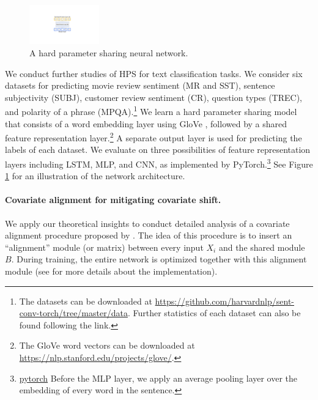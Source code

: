 \begin{figure}
	\vspace{-0.35in}
	\begin{center}
		\includegraphics[width=0.27\textwidth]{figures/mtl_model_arch.pdf}
	\end{center}
	\vspace{-0.28in}
	\caption{A hard parameter sharing neural network.}
	\label{fig_intro_arch}
\end{figure}
We conduct further studies of HPS for text classification tasks.
We consider six datasets for predicting movie review sentiment (MR and SST), sentence subjectivity (SUBJ), customer review sentiment (CR), question types (TREC), and polarity of a phrase (MPQA).\footnote{The datasets can be downloaded at \url{https://github.com/harvardnlp/sent-conv-torch/tree/master/data}. Further statistics of each dataset can also be found following the link.}
We learn a hard parameter sharing model that consists of a word embedding layer using GloVe \cite{pennington2014glove}, followed by a shared feature representation layer.\footnote{The GloVe word vectors can be downloaded at \url{https://nlp.stanford.edu/projects/glove/}.}
A separate output layer is used for predicting the labels of each dataset.
We evaluate on three possibilities of feature representation layers including LSTM, MLP, and CNN, as implemented by PyTorch.\footnote{\url{pytorch} Before the MLP layer, we apply an average pooling layer over the embedding of every word in the sentence.}
See Figure \ref{fig_intro_arch} for an illustration of the network architecture.

\paragraph{Covariate alignment for mitigating covariate shift.}
We apply our theoretical insights to conduct detailed analysis of a covariate alignment procedure proposed by \citet{WZR20}.
The idea of this procedure is to insert an ``alignment'' module (or matrix) between every input $X_i$ and the shared module $B$.
During training, the entire network is optimized together with this alignment module (see \citet{WZR20} for more details about the implementation).


